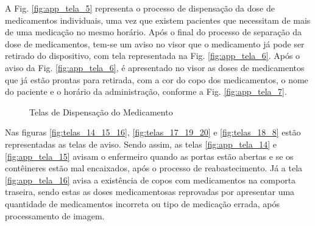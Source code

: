 \begin{apendicesenv}
A Fig. \ref{fig:app_tela_5} representa o processo de dispensação da dose de medicamentos individuais, uma vez que existem pacientes que necessitam de mais de uma medicação no mesmo horário. Após o final do processo de separação da dose de medicamentos, tem-se um aviso no visor que o medicamento já pode ser retirado do dispositivo, com tela representada na Fig. \ref{fig:app_tela_6}. Após o aviso da Fig. \ref{fig:app_tela_6}, é apresentado no visor as doses de medicamentos que já estão prontas para retirada, com a cor do copo dos medicamentos, o nome do paciente e o horário da administração, conforme a Fig. \ref{fig:app_tela_7}.

\begin{figure}[H]
    \centering
    \caption{Telas de Dispensação do Medicamento}\label{fig:telas_5_6_7}
\end{figure}

Nas figuras \ref{fig:telas_14_15_16}, \ref{fig:telas_17_19_20} e \ref{fig:telas_18_8} estão representadas as telas de aviso. Sendo assim, as telas \ref{fig:app_tela_14} e \ref{fig:app_tela_15} avisam o enfermeiro quando as portas estão abertas e se os contêineres estão mal encaixados, após o processo de reabastecimento. Já a tela \ref{fig:app_tela_16} avisa a existência de copos com medicamentos na comporta traseira, sendo estas as doses medicamentosas reprovadas por apresentar uma quantidade de medicamentos incorreta ou tipo de medicação errada, após processamento de imagem. 



\end{apendicesenv}

